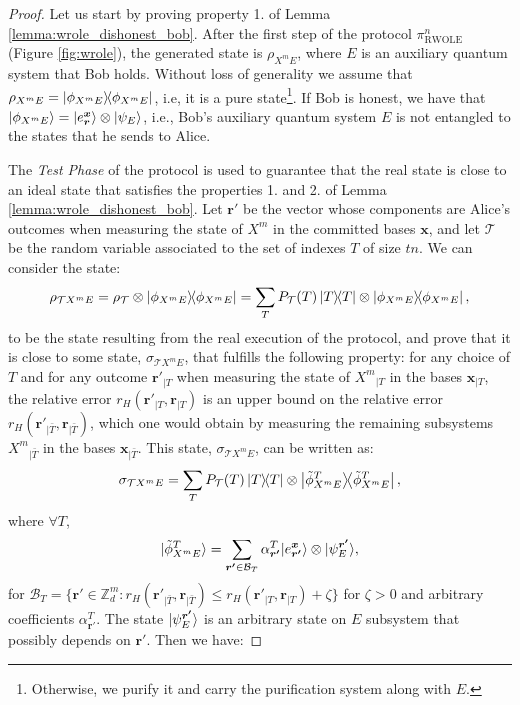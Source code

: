   
\begin{proof}


 Let us start by proving property 1. of Lemma \ref{lemma:wrole_dishonest_bob}.
After the first step of the protocol $\mathcal{\pi}^n_{\text{RWOLE}}$ (Figure \ref{fig:wrole}),  the generated state is $\rho_{X^m E}$, where $E$ is an auxiliary quantum system that Bob holds. Without loss of generality we assume that $\rho_{X^m E} = \ketbra{\phi_{X^m E}}$,   i.e, it is a pure state\footnote{Otherwise, we purify it and carry the purification system along with $E$.}. If Bob is honest, we have that $| \phi_{X^m E} \rangle=| e^{\boldsymbol{x}}_{\boldsymbol{r}} \rangle\otimes | \psi_{E} \rangle$, i.e.,   Bob's auxiliary quantum system $E$ is not entangled to the states that he sends to Alice.  

The \textit{Test Phase} of the protocol is used to guarantee that the real state is close to an ideal state that satisfies the properties 1. and 2. of Lemma \ref{lemma:wrole_dishonest_bob}. Let $\boldsymbol{r'}$ be the vector whose components are Alice's  outcomes when measuring the state of  $X^m$  in the committed bases $\bm{x}$, and let $\mathcal{T}$ be the random variable associated to the set of indexes $T$  of size $t n$. We can consider the state:
\begin{equation}
    \rho_{\mathcal{T}X^m E} = \rho_\mathcal{T}\otimes \ketbra{\phi_{X^m E}} = \sum_{T} P_\mathcal{T}(T) \ketbra{T}\otimes \ketbra{\phi_{X^m E}},
\label{eq:real_definition}
\end{equation}
to be the state resulting from the real execution of the protocol, and prove that it is close to some state, $\sigma_{\mathcal{T}X^m E}$, that fulfills the following property: for any choice of $T$ and for any outcome $\boldsymbol{r'}_{|T}$ when measuring the state of  ${X^m}_{|T}$ in the bases $\boldsymbol{x}_{|T}$, the relative error $r_H(\boldsymbol{r'}_{|T}, \boldsymbol{r}_{|T})$  is an upper bound on the relative error $r_H(\boldsymbol{r'}_{|\bar{T}}, \boldsymbol{r}_{|\bar{T}})$, which one would obtain by measuring the remaining subsystems ${X^m}_{|\bar{T}}$  in the bases $\boldsymbol{x}_{|\bar{T}}$. This state, $\sigma_{\mathcal{T}X^m E}$, can be  written as: 
\begin{equation}
\sigma_{\mathcal{T}X^m E} = \sum_{T} P_\mathcal{T}(T) \ketbra{T}\otimes \ketbra{\tilde{\phi}_{X^m E}^{T}},
\label{eq:ideal_definition}
\end{equation}
where $\forall T$, 
\begin{equation}
| \tilde{\phi}_{X^m E}^{T} \rangle = \sum_{\boldsymbol{r'}\in \mathcal{B}_{T}} \alpha_{\boldsymbol{r'}}^{T}| e^{\boldsymbol{x}}_{\boldsymbol{r'}} \rangle\otimes | \psi^{\boldsymbol{r'}}_{E} \rangle,
\label{eq:ideal_definition_2}
\end{equation}
for  $\mathcal{B}_{T} = \{ \boldsymbol{r'}\in \mathbb{Z}_d^{m}: r_H(\boldsymbol{r'}_{|\bar{T}}, \boldsymbol{r}_{|\bar{T}})\leq r_H(\boldsymbol{r'}_{|T}, \boldsymbol{r}_{|T}) + \zeta \}$  for  $\zeta>0$ and arbitrary coefficients $\alpha^T_{\boldsymbol{r'}}$. The state $| \psi^{\boldsymbol{r'}}_{E} \rangle$ is an arbitrary state on $E$ subsystem that possibly depends on $\boldsymbol{r'}$. Then we have:


\end{proof}
